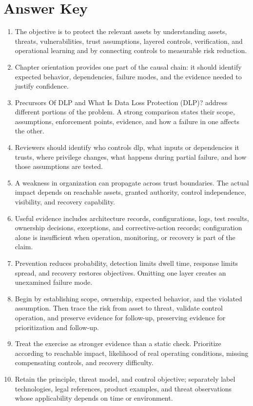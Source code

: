 \documentclass[11pt,letterpaper]{article}
\begin{document}
\section*{Answer Key}
\begin{enumerate}
\item The objective is to protect the relevant assets by understanding assets, threats, vulnerabilities, trust assumptions, layered controls, verification, and operational learning and by connecting controls to measurable risk reduction.
\item Chapter orientation provides one part of the causal chain: it should identify expected behavior, dependencies, failure modes, and the evidence needed to justify confidence.
\item Precursors Of DLP and What Is Data Loss Protection (DLP)? address different portions of the problem. A strong comparison states their scope, assumptions, enforcement points, evidence, and how a failure in one affects the other.
\item Reviewers should identify who controls dlp, what inputs or dependencies it trusts, where privilege changes, what happens during partial failure, and how those assumptions are tested.
\item A weakness in organization can propagate across trust boundaries. The actual impact depends on reachable assets, granted authority, control independence, visibility, and recovery capability.
\item Useful evidence includes architecture records, configurations, logs, test results, ownership decisions, exceptions, and corrective-action records; configuration alone is insufficient when operation, monitoring, or recovery is part of the claim.
\item Prevention reduces probability, detection limits dwell time, response limits spread, and recovery restores objectives. Omitting one layer creates an unexamined failure mode.
\item Begin by establishing scope, ownership, expected behavior, and the violated assumption. Then trace the risk from asset to threat, validate control operation, and preserve evidence for follow-up, preserving evidence for prioritization and follow-up.
\item Treat the exercise as stronger evidence than a static check. Prioritize according to reachable impact, likelihood of real operating conditions, missing compensating controls, and recovery difficulty.
\item Retain the principle, threat model, and control objective; separately label technologies, legal references, product examples, and threat observations whose applicability depends on time or environment.
\end{enumerate}
\end{document}
